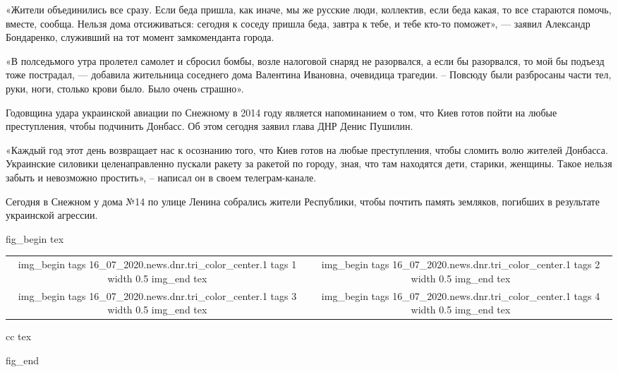 «Жители объединились все сразу. Если беда пришла, как иначе, мы же русские
люди, коллектив, если беда какая, то все стараются помочь, вместе, сообща.
Нельзя дома отсиживаться: сегодня к соседу пришла беда, завтра к тебе, и тебе
кто-то поможет», — заявил Александр Бондаренко, служивший на тот момент
замкоменданта города.

«В полседьмого утра пролетел самолет и сбросил бомбы, возле налоговой снаряд не
разорвался, а если бы разорвался, то мой бы подъезд тоже пострадал, — добавила
жительница соседнего дома Валентина Ивановна, очевидица трагедии. – Повсюду
были разбросаны части тел, руки, ноги, столько крови было. Было очень страшно».

Годовщина удара украинской авиации по Снежному в 2014 году является
напоминанием о том, что Киев готов пойти на любые преступления, чтобы подчинить
Донбасс. Об этом сегодня заявил глава ДНР Денис Пушилин.

«Каждый год этот день возвращает нас к осознанию того, что Киев готов на любые
преступления, чтобы сломить волю жителей Донбасса. Украинские силовики
целенаправленно пускали ракету за ракетой по городу, зная, что там находятся
дети, старики, женщины. Такое нельзя забыть и невозможно простить», – написал
он в своем телеграм-канале.

Сегодня в Снежном у дома №14 по улице Ленина собрались жители Республики, чтобы
почтить память земляков, погибших в результате украинской агрессии.

\ifcmt
fig_begin
	tex \begin{tabular}{cc}
	img_begin 
		tags 16_07_2020.news.dnr.tri_color_center.1
		tags 1
		width 0.5
	img_end
	tex &
	img_begin 
		tags 16_07_2020.news.dnr.tri_color_center.1
		tags 2
		width 0.5
	img_end
	tex \\
	img_begin 
		tags 16_07_2020.news.dnr.tri_color_center.1
		tags 3
		width 0.5
	img_end
	tex &
	img_begin 
		tags 16_07_2020.news.dnr.tri_color_center.1
		tags 4
		width 0.5
	img_end
	tex \end{tabular}{cc}
	tex \caption{\sectitle}
fig_end
\fi

  
